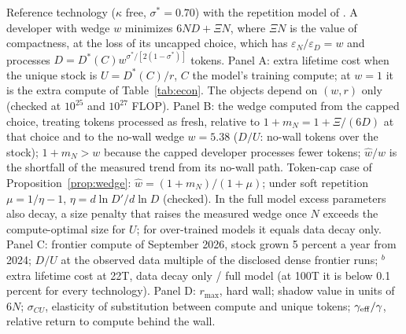 \begin{table}[tp]
\begin{tablenotes}[Notes]
Reference technology ($\kappa$ free, $\sigma^*=0.70$) with the repetition model of \citet{muennighoff2023scaling}. A developer with wedge $w$ minimizes $6ND+\Xi N$, where $\Xi N$ is the value of compactness, at the loss of its uncapped choice, which has $\varepsilon_N/\varepsilon_D=w$ and processes $D=D^*(C)w^{\sigma^*/[2(1-\sigma^*)]}$ tokens. Panel A: extra lifetime cost when the unique stock is $U=D^*(C)/r$, $C$ the model's training compute; at $w=1$ it is the extra compute of Table~\ref{tab:econ}. The objects depend on $(w,r)$ only (checked at $10^{25}$ and $10^{27}$ FLOP). Panel B: the wedge computed from the capped choice, treating tokens processed as fresh, relative to $1+m_N=1+\Xi/(6D)$ at that choice and to the no-wall wedge $w=5.38$ ($D/U$: no-wall tokens over the stock); $1+m_N>w$ because the capped developer processes fewer tokens; $\hat w/w$ is the shortfall of the measured trend from its no-wall path. Token-cap case of Proposition~\ref{prop:wedge}: $\hat w=(1+m_N)/(1+\mu)$; under soft repetition $\mu=1/\eta-1$, $\eta=d\ln D'/d\ln D$ (checked). In the full model excess parameters also decay, a size penalty that raises the measured wedge once $N$ exceeds the compute-optimal size for $U$; for over-trained models it equals data decay only. Panel C: frontier compute of September 2026, stock grown 5 percent a year from 2024; $D/U$ at the observed data multiple of the disclosed dense frontier runs; $^b$extra lifetime cost at 22T, data decay only / full model (at 100T it is below 0.1 percent for every technology). Panel D: $r_{\max}$, hard wall; shadow value in units of $6N$; $\sigma_{CU}$, elasticity of substitution between compute and unique tokens; $\gamma_{\rm eff}/\gamma$, relative return to compute behind the wall.
\end{tablenotes}
\end{table}
